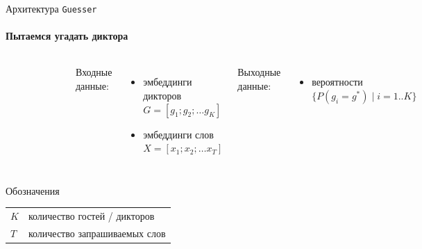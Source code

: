 \documentclass[aspectratio=43]{beamer}
\newcommand{\guesser}{\texttt{Guesser}}
\begin{document}
\begin{frame}{Архитектура \guesser}
\framesubtitle{Пытаемся угадать диктора}
    \begin{columns}
 
    \begin{figure}[bht]
    \includegraphics[width=.8\textwidth]{guesser.png}
    \end{figure}

    Входные данные:
    \begin{itemize}
        \item эмбеддинги дикторов\\
            $G = [g_1; g_2; \ldots g_K]$
        \item эмбеддинги слов\\
            $X = [x_1; x_2; \ldots x_T]$
    \end{itemize}
    Выходные данные:
    \begin{itemize}
        \item вероятности
            $\{P(g_i = g^*) \;|\; i=1..K\}$
    \end{itemize}
    \end{columns}

    \begin{block}{Обозначения}
    \begin{tabular}{l l}
        $K$ & количество гостей / дикторов\\
        $T$ & количество запрашиваемых слов
    \end{tabular}
    \end{block}
\end{frame}
\end{document}
